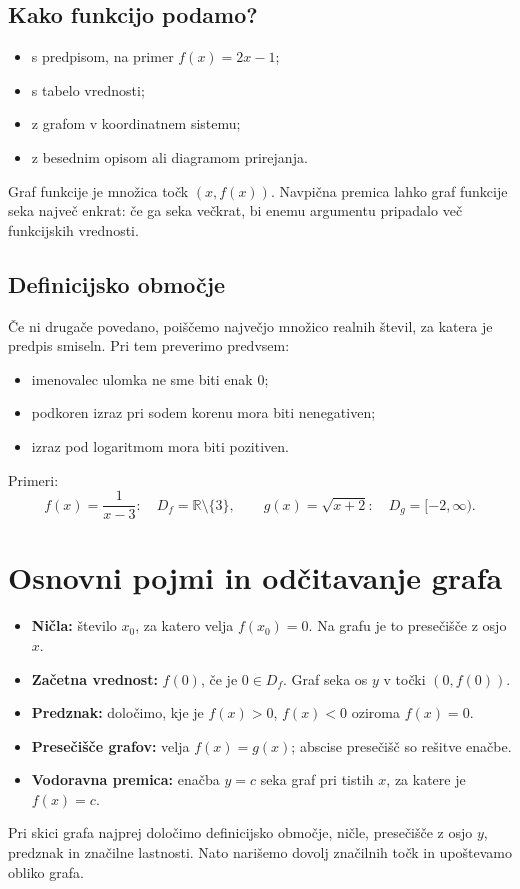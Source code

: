 \documentclass[a4paper,12pt]{article}
\begin{document}
\subsection{Kako funkcijo podamo?}
\begin{itemize}
	\item s predpisom, na primer $f(x)=2x-1$;
	\item s tabelo vrednosti;
	\item z grafom v koordinatnem sistemu;
	\item z besednim opisom ali diagramom prirejanja.
\end{itemize}

Graf funkcije je množica točk $(x,f(x))$. Navpična premica lahko graf funkcije seka največ enkrat: če ga seka večkrat, bi enemu argumentu pripadalo več funkcijskih vrednosti.

\subsection{Definicijsko območje}

Če ni drugače povedano, poiščemo največjo množico realnih števil, za katera je predpis smiseln. Pri tem preverimo predvsem:
\begin{itemize}
	\item imenovalec ulomka ne sme biti enak $0$;
	\item podkoren izraz pri sodem korenu mora biti nenegativen;
	\item izraz pod logaritmom mora biti pozitiven.
\end{itemize}
Primeri:
\[
	f(x)=\frac{1}{x-3}:\quad D_f=\mathbb{R}\setminus\{3\},\qquad
	g(x)=\sqrt{x+2}:\quad D_g=[-2,\infty).
\]

\clearpage
\section{Osnovni pojmi in odčitavanje grafa}
\begin{vsebinskiokvir}

\begin{itemize}
	\item \textbf{Ničla:} število $x_0$, za katero velja $f(x_0)=0$. Na grafu je to presečišče z osjo $x$.
	\item \textbf{Začetna vrednost:} $f(0)$, če je $0\in D_f$. Graf seka os $y$ v točki $(0,f(0))$.
	\item \textbf{Predznak:} določimo, kje je $f(x)>0$, $f(x)<0$ oziroma $f(x)=0$.
	\item \textbf{Presečišče grafov:} velja $f(x)=g(x)$; abscise presečišč so rešitve enačbe.
	\item \textbf{Vodoravna premica:} enačba $y=c$ seka graf pri tistih $x$, za katere je $f(x)=c$.
\end{itemize}

Pri skici grafa najprej določimo definicijsko območje, ničle, presečišče z osjo $y$, predznak in značilne lastnosti. Nato narišemo dovolj značilnih točk in upoštevamo obliko grafa.
\end{vsebinskiokvir}
\end{document}
